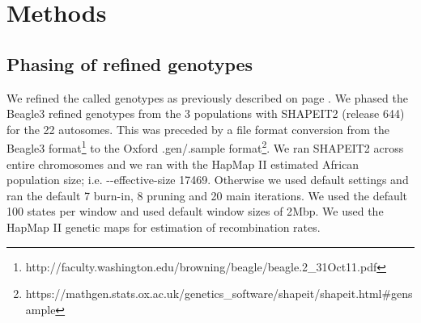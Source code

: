 \section{Methods}
\label{sec:methods_panel}


\subsection{Phasing of refined genotypes}
We refined the called genotypes as previously described on page \pageref{subsec:AGVrefinement}.
We phased the Beagle3 refined genotypes from the 3 populations with SHAPEIT2\cite{Delaneau2012} (release 644) for the 22 autosomes. This was preceded by a file format conversion from the Beagle3 format\footnote{http://faculty.washington.edu/browning/beagle/beagle.2\_31Oct11.pdf} to the Oxford .gen/.sample format\footnote{https://mathgen.stats.ox.ac.uk/genetics\_software/shapeit/shapeit.html\#gensample}. We ran SHAPEIT2 across entire chromosomes and we ran with the HapMap II\cite{hapmap2007} estimated African population size\cite{Wright01031931}\cite{Wright1938}; i.e. -{}-effective-size 17469. Otherwise we used default settings and ran the default 7 burn-in, 8 pruning and 20 main iterations. We used the default 100 states per window and used default window sizes of 2\gls{Mbp}. We used the HapMap II genetic maps for estimation of recombination rates.


